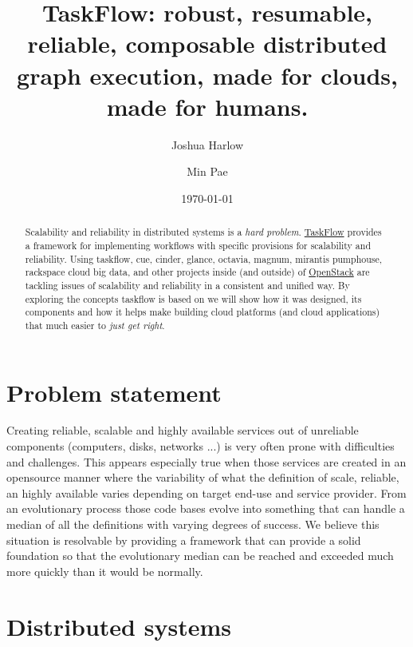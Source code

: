 \documentclass[11pt,a4paper]{article}
\begin{document}
\title{TaskFlow: robust, resumable, reliable, composable distributed graph
       execution, made for clouds, made for humans.}

\date{\today}

\author[1]{Joshua Harlow}
\author[2]{Min Pae}

\maketitle

\begin{abstract}

Scalability and reliability in distributed systems is a \emph{hard problem}.
\href{http://docs.openstack.org/developer/taskflow/}{TaskFlow} provides
a framework for implementing workflows with specific provisions for scalability
and reliability. Using taskflow, cue, cinder, glance, octavia, magnum,
mirantis pumphouse, rackspace cloud big data, and other projects inside (and
outside) of \href{http://www.openstack.org/}{OpenStack} are tackling issues of
scalability and reliability in a consistent and unified way. By exploring
the concepts taskflow is based on we will show how it was designed, its
components and how it helps make building cloud platforms (and cloud
applications) that much easier to \emph{just get right}.

\end{abstract}

\section{Problem statement}

Creating reliable, scalable and highly available services out of unreliable
components (computers, disks, networks ...) is very often prone with
difficulties and challenges. This appears especially true when those services
are created in an opensource manner where the variability of what the
definition of scale, reliable, an highly available varies depending on target
end-use and service provider. From an evolutionary process those code bases
evolve into something that can handle a median of all the definitions with
varying degrees of success. We believe this situation is resolvable
by providing a framework that can provide a solid foundation so that the
evolutionary median can be reached and exceeded much more quickly than it
would be normally.

\section{Distributed systems}
\end{document}
